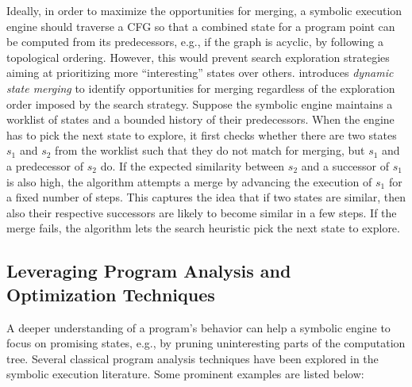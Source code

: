 
 Ideally, in order to maximize the opportunities for merging, a symbolic execution engine should traverse a CFG so that a combined state for a program point can be computed from its predecessors, e.g., if the graph is acyclic, by following a topological ordering. However, this would prevent search exploration strategies aiming at prioritizing more ``interesting'' states over others. \cite{KKB-PLDI12} introduces {\em dynamic state merging} to identify opportunities for merging regardless of the exploration order imposed by the search strategy.
Suppose the symbolic engine maintains a worklist of states and a bounded history of their predecessors. When the engine has to pick the next state to explore, it first checks whether there are two states $s_1$ and $s_2$ from the worklist such that they do not match for merging, but $s_1$ and a predecessor of $s_2$ do. If the expected similarity between $s_2$ and a successor of $s_1$ is also high, the algorithm attempts a merge by advancing the execution of $s_1$ for a fixed number of steps. This captures the idea that if two states are similar, then also their respective successors are likely to become similar in a few steps. If the merge fails, the algorithm lets the search heuristic pick the next state to explore.


\subsection{Leveraging Program Analysis and Optimization Techniques}

A deeper understanding of a program's behavior can help a symbolic engine to focus on promising states, e.g., by pruning uninteresting parts of the computation tree. Several classical program analysis techniques have been explored in the symbolic execution literature. Some prominent examples are listed below:

